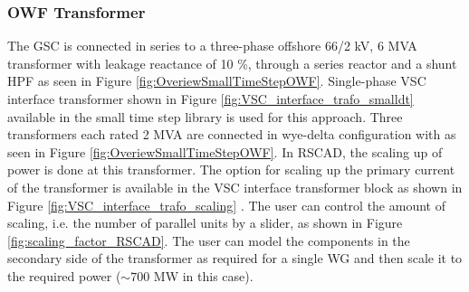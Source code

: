 \subsubsection{OWF Transformer}\label{scaling_OWF}
The \gls{GSC} is connected in series to a three-phase offshore 66/2 kV, 6 MVA transformer with leakage reactance of 10 \%, through a series reactor and a shunt \gls{HPF} as seen in Figure \ref{fig:OveriewSmallTimeStepOWF}. Single-phase \gls{VSC} interface transformer shown in Figure \ref{fig:VSC_interface_trafo_smalldt} available in the small time step library is used for this approach. Three transformers each rated 2 MVA are connected in wye-delta configuration with as seen in Figure \ref{fig:OveriewSmallTimeStepOWF}. In RSCAD, the scaling up of power is done at this transformer. The option for scaling up the primary current of the transformer is available in the \gls{VSC} interface transformer block as shown in Figure \ref{fig:VSC_interface_trafo_scaling} \cite{rtds_tech}. The user can control the amount of scaling, i.e. the number of parallel units by a slider, as shown in Figure \ref{fig:scaling_factor_RSCAD}. The user can model the components in the secondary side of the transformer as required for a single \gls{WG} and then scale it to the required power ($\sim{700}$ MW in this case).

